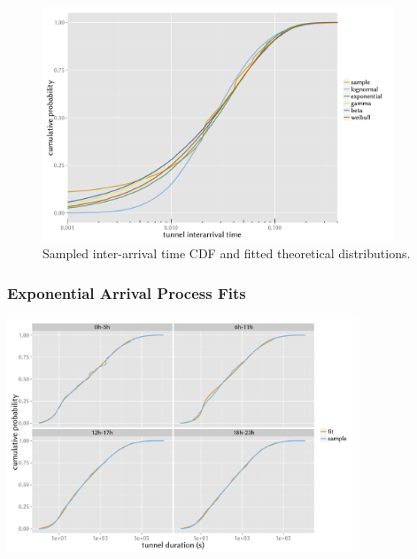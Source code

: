 \documentclass{beamer}
\begin{document}
\begin{frame}
	\begin{figure}[htb]
		\centering
		\includegraphics[height=7cm]{extras/R-IAT-ecdfs.png}
		\caption{Sampled inter-arrival time CDF and fitted theoretical distributions.}
	\end{figure}
\end{frame}

\begin{frame}
	\frametitle{Exponential Arrival Process Fits}

	\begin{center}
		\includegraphics[height=7cm]{extras/R-duration-fit-cdf-facets.png}
	\end{center}
\end{frame}
\end{document}
